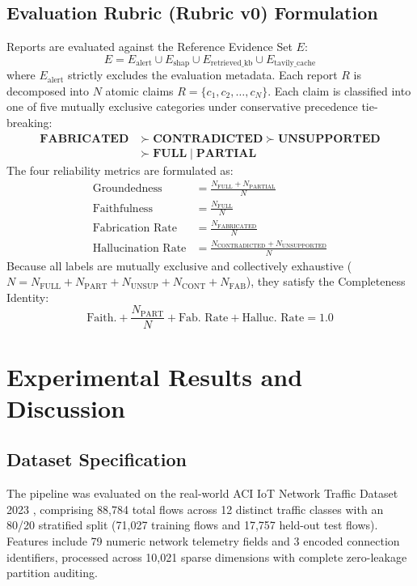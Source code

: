 \documentclass[conference]{IEEEtran}
\begin{document}
\subsection{Evaluation Rubric (Rubric v0) Formulation}
Reports are evaluated against the Reference Evidence Set $E$:
\begin{equation}
E = E_{\text{alert}} \cup E_{\text{shap}} \cup E_{\text{retrieved\_kb}} \cup E_{\text{tavily\_cache}}
\end{equation}
where $E_{\text{alert}}$ strictly excludes the evaluation metadata. Each report $R$ is decomposed into $N$ atomic claims $R = \{c_1, c_2, \dots, c_N\}$. Each claim is classified into one of five mutually exclusive categories under conservative precedence tie-breaking:
\begin{equation}
\begin{split}
\mathbf{FABRICATED} &\succ \mathbf{CONTRADICTED} \succ \mathbf{UNSUPPORTED} \\
&\succ \mathbf{FULL} \mid \mathbf{PARTIAL}
\end{split}
\end{equation}
The four reliability metrics are formulated as:
\begin{align}
\text{Groundedness} &= \frac{N_{\text{FULL}} + N_{\text{PARTIAL}}}{N} \\
\text{Faithfulness} &= \frac{N_{\text{FULL}}}{N} \\
\text{Fabrication Rate} &= \frac{N_{\text{FABRICATED}}}{N} \\
\text{Hallucination Rate} &= \frac{N_{\text{CONTRADICTED}} + N_{\text{UNSUPPORTED}}}{N}
\end{align}
Because all labels are mutually exclusive and collectively exhaustive ($N = N_{\text{FULL}} + N_{\text{PART}} + N_{\text{UNSUP}} + N_{\text{CONT}} + N_{\text{FAB}}$), they satisfy the Completeness Identity:
\begin{equation}
\text{Faith.} + \frac{N_{\text{PART}}}{N} + \text{Fab.\ Rate} + \text{Halluc.\ Rate} = 1.0
\end{equation}

\section{Experimental Results and Discussion}

\subsection{Dataset Specification}
The pipeline was evaluated on the real-world ACI IoT Network Traffic Dataset 2023 \cite{ieeedataport2023aci, nack2024aci}, comprising 88,784 total flows across 12 distinct traffic classes with an 80/20 stratified split (71,027 training flows and 17,757 held-out test flows). Features include 79 numeric network telemetry fields and 3 encoded connection identifiers, processed across 10,021 sparse dimensions with complete zero-leakage partition auditing.
\end{document}
